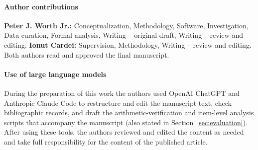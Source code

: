 \documentclass[twocolumn]{svjour3}
\begin{document}
\paragraph{Author contributions}
\textbf{Peter J. Worth Jr.:} Conceptualization, Methodology, Software, Investigation, Data curation, Formal analysis, Writing -- original draft, Writing -- review and editing. \textbf{Ionut Cardei:} Supervision, Methodology, Writing -- review and editing. Both authors read and approved the final manuscript.

\paragraph{Use of large language models}
During the preparation of this work the authors used OpenAI ChatGPT and Anthropic Claude Code to restructure and edit the manuscript text, check bibliographic records, and draft the arithmetic-verification and item-level analysis scripts that accompany the manuscript (also stated in Section~\ref{sec:evaluation}). After using these tools, the authors reviewed and edited the content as needed and take full responsibility for the content of the published article.



\end{document}
